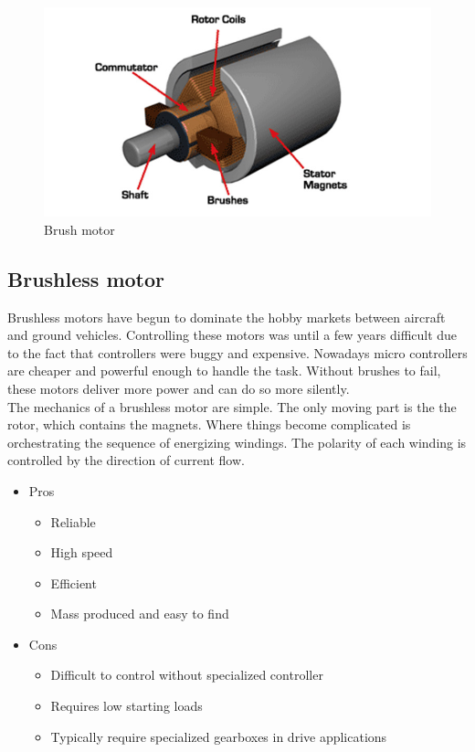 \documentclass[11pt]{article}
\begin{document}
\begin{figure}[hbtp]
\caption{Brush motor }
\centering
\includegraphics[scale=1]{build/brushMotor.png}
\end{figure} 		

\newpage

	\subsection{Brushless motor}
Brushless motors have begun to dominate the hobby markets between aircraft and ground vehicles. Controlling these motors was until a few years difficult due to the fact that controllers were buggy and expensive. Nowadays micro controllers are cheaper and powerful enough to handle the task. Without brushes to fail, these motors deliver more power and can do so more silently.\\

The mechanics of a brushless motor are simple. The only moving part is the the rotor, which contains the magnets. Where things become complicated is orchestrating the sequence of energizing windings. The polarity of each winding is controlled by the direction of current flow. 

\begin{itemize}		
\item Pros
\begin{itemize}
		\item Reliable
		\item High speed
		\item Efficient
		\item Mass produced and easy to find
	\end{itemize}		
\end{itemize}	 
 	
 				
\begin{itemize}		
\item Cons
\begin{itemize}
		\item Difficult to control without specialized controller
		\item Requires low starting loads
		\item Typically require specialized gearboxes in drive applications
	
	\end{itemize}		
\end{itemize}	
\end{document}
